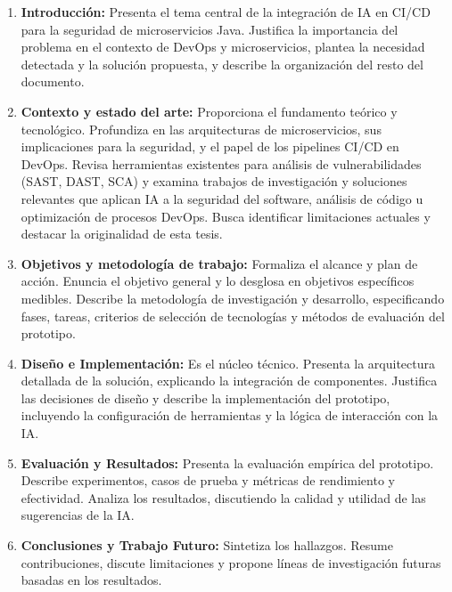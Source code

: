 \begin{enumerate}
\item \textbf{Introducción:} Presenta el tema central de la integración de IA en CI/CD para la seguridad de microservicios Java. Justifica la importancia del problema en el contexto de DevOps y microservicios, plantea la necesidad detectada y la solución propuesta, y describe la organización del resto del documento.

\item \textbf{Contexto y estado del arte:} Proporciona el fundamento teórico y tecnológico. Profundiza en las arquitecturas de microservicios, sus implicaciones para la seguridad, y el papel de los pipelines CI/CD en DevOps. Revisa herramientas existentes para análisis de vulnerabilidades (SAST, DAST, SCA) y examina trabajos de investigación y soluciones relevantes que aplican IA a la seguridad del software, análisis de código u optimización de procesos DevOps. Busca identificar limitaciones actuales y destacar la originalidad de esta tesis.

\item \textbf{Objetivos y metodología de trabajo:} Formaliza el alcance y plan de acción. Enuncia el objetivo general y lo desglosa en objetivos específicos medibles. Describe la metodología de investigación y desarrollo, especificando fases, tareas, criterios de selección de tecnologías y métodos de evaluación del prototipo.

\item \textbf{Diseño e Implementación:} Es el núcleo técnico. Presenta la arquitectura detallada de la solución, explicando la integración de componentes. Justifica las decisiones de diseño y describe la implementación del prototipo, incluyendo la configuración de herramientas y la lógica de interacción con la IA.

\item \textbf{Evaluación y Resultados:} Presenta la evaluación empírica del prototipo. Describe experimentos, casos de prueba y métricas de rendimiento y efectividad. Analiza los resultados, discutiendo la calidad y utilidad de las sugerencias de la IA.

\item \textbf{Conclusiones y Trabajo Futuro:} Sintetiza los hallazgos. Resume contribuciones, discute limitaciones y propone líneas de investigación futuras basadas en los resultados.
\end{enumerate}